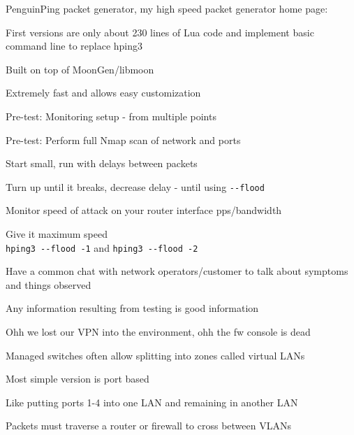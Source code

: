 \documentclass[Screen16to9,17pt]{foils}
\begin{document}


\begin{list2}
\item PenguinPing packet generator, my high speed packet generator
home page: 
\item First versions are only about 230 lines of Lua code and implement basic command line to replace hping3
\item Built on top of MoonGen/libmoon 
\end{list2}

\centerline{Extremely fast and allows easy customization}



\begin{list2}
\item Pre-test: Monitoring setup - from multiple points
\item Pre-test: Perform full Nmap scan of network and ports
\item Start small, run with delays between packets
\item Turn up until it breaks, decrease delay - until using \verb+--flood+
\item Monitor speed of attack on your router interface pps/bandwidth
\item Give it maximum speed\\
 \verb+hping3 --flood -1+ and \verb+hping3 --flood -2+
\item Have a common chat with network operators/customer to talk about symptoms and things observed
\item Any information resulting from testing is good information
\end{list2}

\vskip 1cm
\centerline{Ohh we lost our VPN into the environment, ohh the fw console is dead}




\begin{list1}
\item Managed switches often allow splitting into zones called virtual LANs
\item Most simple version is port based
\item Like putting ports 1-4 into one LAN and remaining in another LAN
\item Packets must traverse a router or firewall to cross between VLANs
\end{list1}
\end{document}
